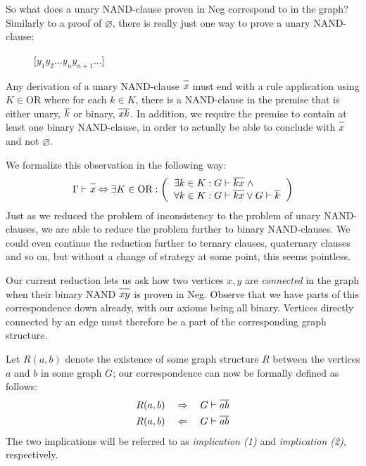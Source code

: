 So what does a unary NAND-clause proven in Neg correspond to in the graph?
Similarly to a proof of $\varnothing$, there is really just one way to prove a unary NAND-clause:\par
\begin{figure}[!h]
  \centering
  \begin{prooftree*}
    \Hypo{\dots}
    \Hypo{\dots}
    [$y_1y_2\dots y_ny_{n+1}\dots$]{}
  \end{prooftree*}
  \caption{}
  \label{fig:proof_unary_nand}
\end{figure}
Any derivation of a unary NAND-clause $\ol{x}$ must end with a rule application using $K \in \text{OR}$ where for each $k \in K$, there is a NAND-clause in the premise that is either unary, $\ol{k}$ or binary, $\ol{xk}$.
In addition, we require the premise to contain at least one binary NAND-clause, in order to actually be able to conclude with $\ol x$ and not $\varnothing$.

We formalize this observation in the following way:
\begin{align}
  \Gamma \vdash \ol{x} \Leftrightarrow \exists K \in \text{OR}:
  \left ( \begin{tabular}{l}
  $\exists k \in K: G \vdash \ol{kx} \; \wedge$\\
  $\forall k \in K: G \vdash \ol{kx} \vee G \vdash \ol{k}$
  \end{tabular} \right )
\end{align}
Just as we reduced the problem of inconsistency to the problem of unary NAND-clauses, we are able to reduce the problem further to binary NAND-clauses.
We could even continue the reduction further to ternary clauses, quaternary clauses and so on, but without a change of strategy at some point, this seems pointless.

Our current reduction lets us ask how two vertices $x,y$ are \textit{connected} in the graph when their binary NAND $\ol{xy}$ is proven in Neg.
Observe that we have parts of this correspondence down already, with our axioms being all binary.
Vertices directly connected by an edge must therefore be a part of the corresponding graph structure.

Let $R(a,b)$ denote the existence of some graph structure $R$ between the vertices $a$ and $b$ in some graph $G$; our correspondence can now be formally defined as follows:
\begin{align}
  R(a,b) \quad \Rightarrow \quad G \vdash \ol{ab}\\
  R(a,b) \quad \Leftarrow \quad G \vdash \ol{ab}
\end{align}
The two implications will be referred to as \textit{implication (1)} and \textit{implication (2)}, respectively.

